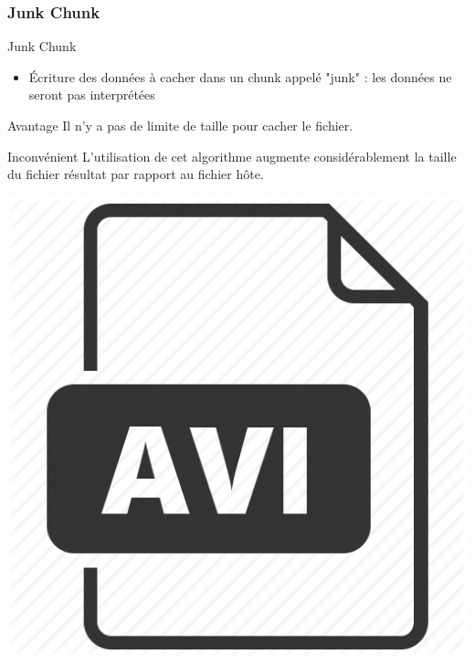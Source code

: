 \documentclass{beamer}
\begin{document}
    \subsubsection{Junk Chunk}
    \begin{frame}
    
	\begin{block}{Junk Chunk}
	\begin{itemize}
	[circle]
	\item Écriture des données à cacher dans un chunk appelé "junk" : les 
	données ne seront pas interprétées  
	\end{itemize}
	\end{block}
	
	\begin{exampleblock}{Avantage} 
	Il n'y a pas de limite de taille pour cacher le fichier. 
	\end{exampleblock}
	
	\begin{alertblock}{Inconvénient} 
	L'utilisation de cet algorithme augmente considérablement la taille du 
	fichier résultat par rapport au fichier hôte. 
	\end{alertblock}
	
	\hspace{4.4cm}
    \includegraphics[scale=0.08]{pictures/avi-512.png}
    
    \end{frame}
    
\end{document}
